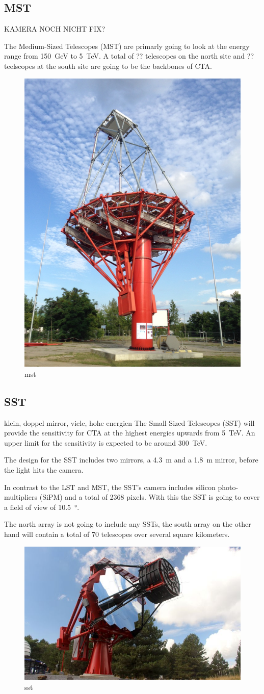 \subsection{MST}

KAMERA NOCH NICHT FIX?

The Medium-Sized Telescopes (MST) are primarly going to look at the 
energy range from \SI{150}{\giga\electronvolt} to \SI{5}{\tera\electronvolt}.
A total of ?? telescopes on the north site and ?? teelscopes at the south site 
are going to be the backbones of CTA.

\begin{figure}
	\center
	\includegraphics[width=.5\textwidth]{images/mst.png}
	\caption{mst \cite{cta_web}}
	\label{fig:mst}
\end{figure}

\subsection{SST}
klein, doppel mirror, viele, hohe energien
The Small-Sized Telescopes (SST) will provide the sensitivity for CTA at the 
highest energies upwards from \SI{5}{\tera\electronvolt}.
An upper limit for the sensitivity is expected to be around \SI{300}{\tera\electronvolt}.

The design for the SST includes two mirrors, a \SI{4.3}{\meter} and a \SI{1.8}{\meter}
mirror, before the light hits the camera.

In contrast to the LST and MST, the SST's camera includes silicon photo-multipliers
(SiPM) and a total of 2368 pixels. With this the SST is going to cover a field of view 
of \SI{10.5}{\degree}.

The north array is not going to include any SSTs, the 
south array on the other hand will contain a total of 70 telescopes over
several square kilometers.

\begin{figure}
	\center
	\includegraphics[width=.5\textwidth]{images/sst.jpg}
	\caption{sst \cite{cta_web}}
	\label{fig:sst}
\end{figure}
